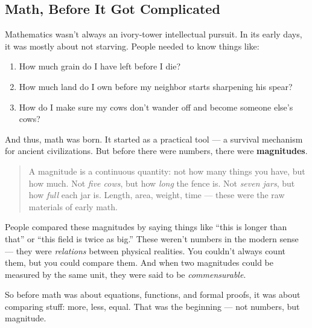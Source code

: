 \subsection{Math, Before It Got Complicated}

Mathematics wasn’t always an ivory-tower intellectual pursuit. In its early days, it was mostly about not starving. People needed to know things like:  

\begin{enumerate}
	\item How much grain do I have left before I die?  
	\item How much land do I own before my neighbor starts sharpening his spear?  
	\item How do I make sure my cows don’t wander off and become someone else’s cows?  
\end{enumerate}

And thus, math was born. It started as a practical tool — a survival mechanism for ancient civilizations. But before there were numbers, there were \textbf{magnitudes}.

\begin{quote}
A magnitude is a continuous quantity: not how many things you have, but how much. Not \emph{five cows}, but how \emph{long} the fence is. Not \emph{seven jars}, but how \emph{full} each jar is. Length, area, weight, time — these were the raw materials of early math.
\end{quote}

People compared these magnitudes by saying things like “this is longer than that” or “this field is twice as big.” These weren’t numbers in the modern sense — they were \emph{relations} between physical realities. You couldn’t always count them, but you could compare them. And when two magnitudes could be measured by the same unit, they were said to be \emph{commensurable}.

So before math was about equations, functions, and formal proofs, it was about comparing stuff: more, less, equal. That was the beginning — not numbers, but magnitude.

